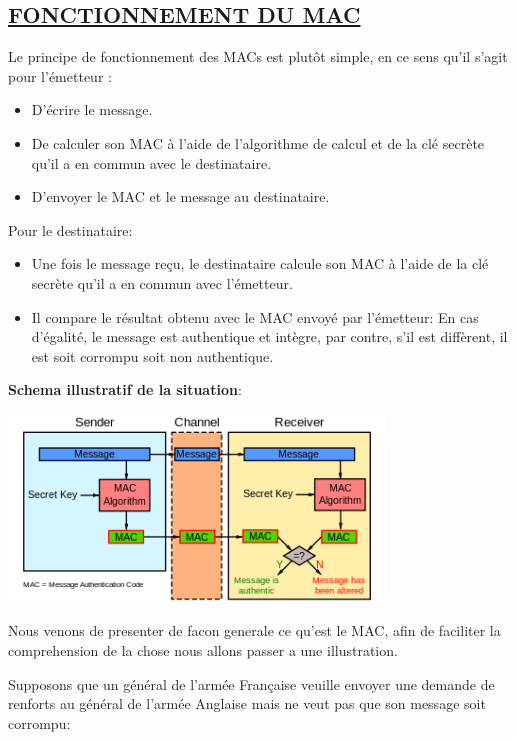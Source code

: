 \subsection{\textbf{\underline{FONCTIONNEMENT DU MAC}}}

Le principe de fonctionnement des MACs est plutôt simple, en ce sens qu'il s'agit pour l'émetteur :
\begin{itemize}[label=$\cdot$]
    \item D'écrire le message.
    \item De calculer son MAC à l'aide de l'algorithme de calcul et de la clé secrète qu'il a en commun avec le destinataire.
	\item D'envoyer le MAC et le message au destinataire.
\end{itemize}
Pour le destinataire:
\begin{itemize}[label=$\cdot$]
    \item Une fois le message reçu, le destinataire calcule son MAC à l'aide de la clé secrète qu'il a en commun avec l'émetteur.
    \item Il compare le résultat obtenu avec le MAC envoyé par l'émetteur: En cas d'égalité, le message est authentique et intègre, par contre, s'il est  diffèrent, il est soit corrompu soit non authentique.
\end{itemize}

\begin{center}
\textbf{Schema illustratif de la situation}:\newline \newline

    \includegraphics[width=10cm, height=5cm]{Sections/Images/fonctionnement.png}
\end{center}

Nous venons de presenter de facon generale ce qu'est le MAC, afin de faciliter la comprehension de la chose nous allons passer a une illustration.

Supposons que un général de l'armée Française veuille envoyer une demande de renforts au général de l'armée Anglaise mais ne veut pas que son message soit corrompu:


